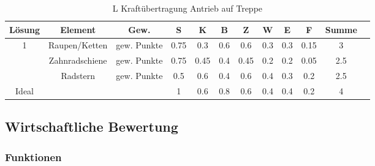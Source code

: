 \documentclass[10pt,a4paper]{article}
\begin{document}
\begin{table}[h!]
    \centering
    \begin{tabular}{cccccccccccc}
        \toprule
        \textbf{Lösung} & \textbf{Element} & \textbf{Gew.} & \textbf{S} & \textbf{K} & \textbf{B} & \textbf{Z} & \textbf{W} & \textbf{E} & \textbf{F} & \textbf{Summe} & \\
        \midrule
        1               & Raupen/Ketten    & gew. Punkte   & 0.75       & 0.3        & 0.6        & 0.6        & 0.3        & 0.3        & 0.15       & 3                \\
        \addlinespace
        2               & Zahnradschiene   & gew. Punkte   & 0.75       & 0.45       & 0.4        & 0.45       & 0.2        & 0.2        & 0.05       & 2.5              \\
        \addlinespace
        3               & Radstern         & gew. Punkte   & 0.5        & 0.6        & 0.4        & 0.6        & 0.4        & 0.3        & 0.2        & 2.5              \\
        \midrule
        Ideal           &                  &               & 1          & 0.6        & 0.8        & 0.6        & 0.4        & 0.4        & 0.2        & 4                \\
        \bottomrule
    \end{tabular}
    \caption{L Kraftübertragung Antrieb auf Treppe}
    \label{tab:kraftuebertragung}
\end{table}
\FloatBarrier

\subsection{Wirtschaftliche Bewertung}
\subsubsection{Funktionen}
\end{document}
